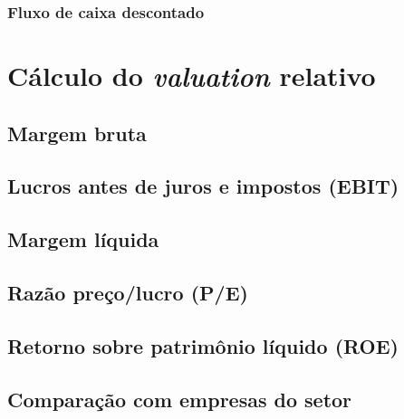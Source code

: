\documentclass[grad,numbers]{coppe}
\begin{document}
  \hypertarget{fluxo-de-caixa-descontado}{%
  \subsubsection{Fluxo de caixa descontado}\label{fluxo-de-caixa-descontado}}

  \hypertarget{cuxe1lculo-do-valuation-relativo}{%
  \section{\texorpdfstring{Cálculo do \emph{valuation} relativo}{Cálculo do valuation relativo}}\label{cuxe1lculo-do-valuation-relativo}}

  \hypertarget{margem-bruta}{%
  \subsection{Margem bruta}\label{margem-bruta}}

  \hypertarget{lucros-antes-de-juros-e-impostos-ebit}{%
  \subsection{Lucros antes de juros e impostos (EBIT)}\label{lucros-antes-de-juros-e-impostos-ebit}}

  \hypertarget{margem-luxedquida}{%
  \subsection{Margem líquida}\label{margem-luxedquida}}

  \hypertarget{razuxe3o-preuxe7olucro-pe}{%
  \subsection{Razão preço/lucro (P/E)}\label{razuxe3o-preuxe7olucro-pe}}

  \hypertarget{retorno-sobre-patrimuxf4nio-luxedquido-roe}{%
  \subsection{Retorno sobre patrimônio líquido (ROE)}\label{retorno-sobre-patrimuxf4nio-luxedquido-roe}}

  \hypertarget{comparauxe7uxe3o-com-empresas-do-setor}{%
  \subsection{Comparação com empresas do setor}\label{comparauxe7uxe3o-com-empresas-do-setor}}
\end{document}
